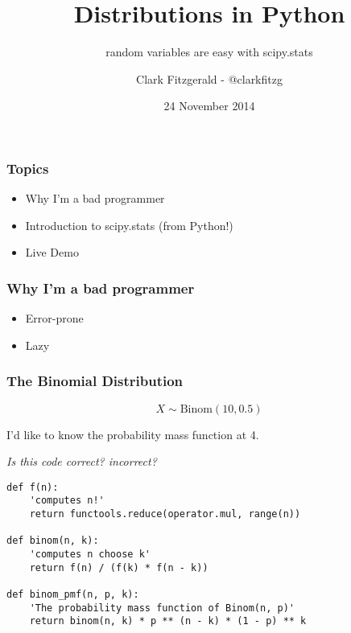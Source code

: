 \documentclass{beamer}
\begin{document}
\title[Python] %
{Distributions in Python}
\subtitle{random variables are easy with scipy.stats}
\author{Clark Fitzgerald - @clarkfitzg}
\date{24 November 2014} %
\subject{Statistics}

\frame{\titlepage}


\begin{frame}


\frametitle{Topics}

\begin{itemize}

    \item Why I'm a bad programmer
    \item Introduction to scipy.stats (from Python!)
    \item Live Demo

\end{itemize}


\end{frame}
\begin{frame}


    \frametitle{Why I'm a bad programmer}

    \begin{itemize}
        \item Error-prone
        \item Lazy
    \end{itemize}


\end{frame}
\begin{frame}[fragile]


    \frametitle{The Binomial Distribution}

    \[
        X \sim \text{Binom} (10, 0.5)
\]
    
I'd like to know the probability mass function at 4.

    \emph{Is this code correct? incorrect?}

\begin{verbatim}
def f(n):
    'computes n!'
    return functools.reduce(operator.mul, range(n))

def binom(n, k):
    'computes n choose k'
    return f(n) / (f(k) * f(n - k))

def binom_pmf(n, p, k):
    'The probability mass function of Binom(n, p)'
    return binom(n, k) * p ** (n - k) * (1 - p) ** k
\end{verbatim}


\end{frame}
\end{document}
